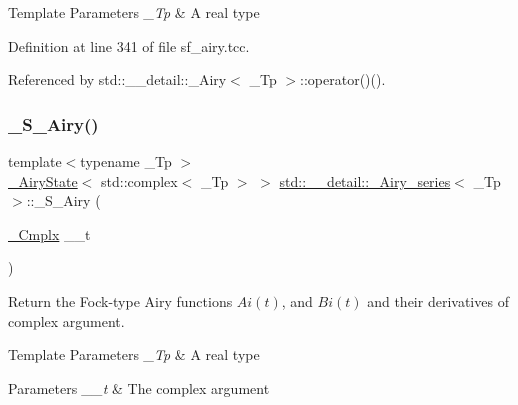 \begin{DoxyTemplParams}{Template Parameters}
{\em \+\_\+\+Tp} & A real type \\
\hline
\end{DoxyTemplParams}


Definition at line 341 of file sf\+\_\+airy.\+tcc.



Referenced by std\+::\+\_\+\+\_\+detail\+::\+\_\+\+Airy$<$ \+\_\+\+Tp $>$\+::operator()().

\mbox{\label{classstd_1_1____detail_1_1__Airy__series_ae0a269ac8e81f22fe35193b5bb7931ae}} 
\subsubsection{\texorpdfstring{\+\_\+\+S\+\_\+\+Airy()}{\_S\_Airy()}}
{\footnotesize\ttfamily template$<$typename \+\_\+\+Tp $>$ \\
\hyperlink{structstd_1_1____detail_1_1__AiryState}{\+\_\+\+Airy\+State}$<$ std\+::complex$<$ \+\_\+\+Tp $>$ $>$ \hyperlink{classstd_1_1____detail_1_1__Airy__series}{std\+::\+\_\+\+\_\+detail\+::\+\_\+\+Airy\+\_\+series}$<$ \+\_\+\+Tp $>$\+::\+\_\+\+S\+\_\+\+Airy (\begin{DoxyParamCaption}\item[{\hyperlink{classstd_1_1____detail_1_1__Airy__series_ab41161caa54609f4735987fbaed41d9d}{\+\_\+\+Cmplx}}]{\+\_\+\+\_\+t }\end{DoxyParamCaption})\hspace{0.3cm}{\ttfamily [static]}}

Return the Fock-\/type Airy functions $ Ai(t) $, and $ Bi(t) $ and their derivatives of complex argument.


\begin{DoxyTemplParams}{Template Parameters}
{\em \+\_\+\+Tp} & A real type \\
\hline
\end{DoxyTemplParams}

\begin{DoxyParams}{Parameters}
{\em \+\_\+\+\_\+t} & The complex argument \\
\hline
\end{DoxyParams}


